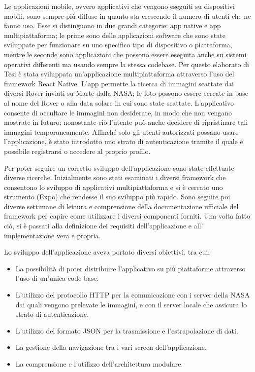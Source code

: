 \documentclass[a4paper,11pt]{article}
\begin{document}
\maketitle
Le applicazioni mobile, ovvero applicativi che vengono eseguiti su dispositivi mobili, sono sempre pi\`u diffuse in quanto sta crescendo il numero di utenti che ne fanno uso.
Esse si distinguono in due grandi categorie: app native e app multipiattaforma; le prime sono delle applicazioni software che sono state sviluppate per funzionare su uno
specifico tipo di dispositivo o piattaforma, mentre le seconde sono applicazioni che possono essere eseguita anche su sistemi operativi differenti ma usando sempre la stessa codebase.
Per questo elaborato di Tesi \`e stata sviluppata un'applicazione multipiattaforma attraverso l'uso del framework React Native. L'app permette la ricerca di immagini scattate dai
diversi Rover inviati su Marte dalla NASA; le foto possono essere cercate in base al nome del Rover o alla data solare in cui sono state scattate. L'applicativo consente di
occultare le immagini non desiderate, in modo che non vengano mostrate in futuro; nonostante ci\`o l'utente pu\`o anche decidere di ripristinare tali immagini temporaneamente. Affinch\'e solo gli utenti
autorizzati possano usare l'applicazione, \`e stato introdotto uno strato di autenticazione tramite il quale \`e possibile registrarsi o accedere al proprio profilo.

Per poter seguire un corretto sviluppo dell'applicazione sono state effettuate diverse ricerche. Inizialmente sono stati esaminati i diversi framework che consentono lo sviluppo di applicativi multipiattaforma
e si \`e cercato uno strumento (Expo) che rendesse il suo sviluppo pi\`u rapido. Sono seguite poi diverse settimane di lettura e comprensione della documentazione ufficiale del framework per capire
come utilizzare i diversi componenti forniti. Una volta fatto ci\`o, si \`e passati alla definizione dei requisiti dell'applicazione e all' implementazione vera e propria.

Lo sviluppo dell'applicazione aveva portato diversi obiettivi, tra cui:

\begin{itemize}
    \item La possibilit\`a di poter distribuire l'applicativo su pi\`u piattaforme attraverso l'uso di un'unica code base.
    \item L'utilizzo del protocollo HTTP per la comunicazione con i server della NASA dai quali vengono prelevate le immagini, e con il server locale che assicura lo strato di autenticazione.
    \item L'utilizzo del formato JSON per la trasmissione e l'estrapolazione di dati.
    \item La gestione della navigazione tra i vari screen dell'applicazione.
    \item La comprensione e l'utilizzo dell'architettura modulare.
\end{itemize}
\end{document}
